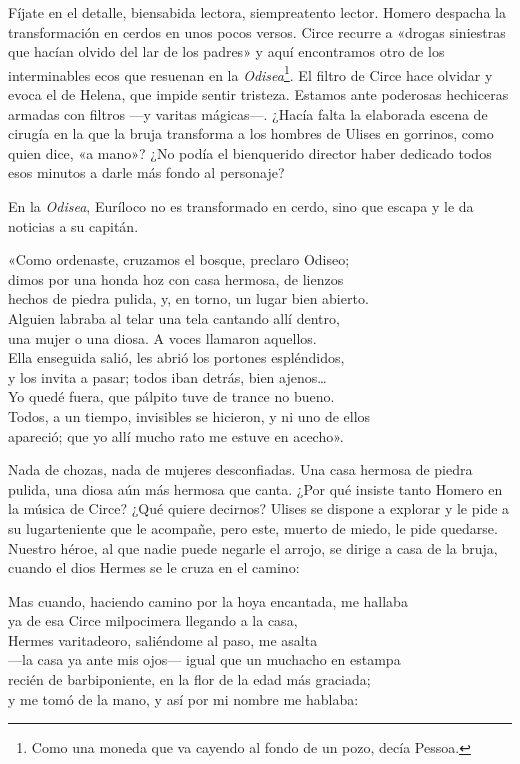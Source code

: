 Fíjate en el detalle, biensabida lectora, siempreatento lector. Homero despacha la transformación en cerdos en unos pocos versos. Circe recurre a «drogas siniestras que hacían olvido del lar de los padres» y aquí encontramos otro de los interminables ecos que resuenan en la \emph{Odisea}\footnote{Como una moneda que va cayendo al fondo de un pozo, decía Pessoa.}. El filtro de Circe hace olvidar y evoca el de Helena, que impide sentir tristeza. Estamos ante poderosas hechiceras armadas con filtros ---y varitas mágicas---. ¿Hacía falta la elaborada escena de cirugía en la que la bruja transforma a los hombres de Ulises en gorrinos, como quien dice, «a mano»? ¿No podía el bienquerido director haber dedicado todos esos minutos a darle más fondo al personaje?

En la \emph{Odisea}, Euríloco no es transformado en cerdo, sino que escapa y le da noticias a su capitán.

\begin{versocita}
«Como ordenaste, cruzamos el bosque, preclaro Odiseo;\\
dimos por una honda hoz con casa hermosa, de lienzos\\
hechos de piedra pulida, y, en torno, un lugar bien abierto.\\
Alguien labraba al telar una tela cantando allí dentro,\\
una mujer o una diosa. A voces llamaron aquellos.\\
Ella enseguida salió, les abrió los portones espléndidos,\\
y los invita a pasar; todos iban detrás, bien ajenos…\\
Yo quedé fuera, que pálpito tuve de trance no bueno.\\
Todos, a un tiempo, invisibles se hicieron, y ni uno de ellos\\
apareció; que yo allí mucho rato me estuve en acecho».
\end{versocita}

Nada de chozas, nada de mujeres desconfiadas. Una casa hermosa de piedra pulida, una diosa aún más hermosa que canta. ¿Por qué insiste tanto Homero en la música de Circe? ¿Qué quiere decirnos? Ulises se dispone a explorar y le pide a su lugarteniente que le acompañe, pero este, muerto de miedo, le pide quedarse. Nuestro héroe, al que nadie puede negarle el arrojo, se dirige a casa de la bruja, cuando el dios Hermes se le cruza en el camino:

\begin{versocita}
Mas cuando, haciendo camino por la hoya encantada, me hallaba\\
ya de esa Circe milpocimera llegando a la casa,\\
Hermes varitadeoro, saliéndome al paso, me asalta\\
---la casa ya ante mis ojos--- igual que un muchacho en estampa\\
recién de barbiponiente, en la flor de la edad más graciada;\\
y me tomó de la mano, y así por mi nombre me hablaba:
\end{versocita}

